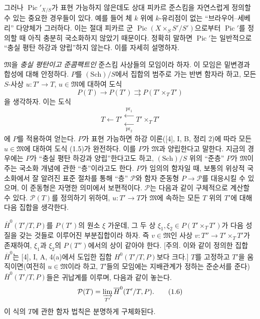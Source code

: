 그러나 $\operatorname{Pic}'_{X/S}$가 표현 가능하지 않은데도 상대 피카르
준스킴을 자연스럽게 정의할 수 있는 중요한 경우들이 있다. 예를 들어 체
$k$ 위에 $k$-유리점이 없는 “브라우어--세베리” 다양체가 그러하다. 이는
절대 피카르 군 $\operatorname{Pic}(X\times_S S'/S')$으로부터
$\operatorname{Pic}'$를 정의할 때 아직 충분히 국소화하지 않았기
때문이다. 정확히 말하면 $\operatorname{Pic}'$는 일반적으로 “충실 평탄
하강과 양립”하지 않는다. 이를 자세히 설명하자.

$\mathfrak M$을 \emph{충실 평탄이고 준콤팩트인} 준스킴 사상들의 모임이라
하자. 이 모임은 밑변경과 합성에 대해 안정하다. $P$를
$(\mathrm{Sch})/S$에서 집합의 범주로 가는 반변 함자라 하고, 모든
$S$-사상 $u:T'\longrightarrow T$, $u\in\mathfrak M$에 대하여 도식
\begin{equation}
P(T)\longrightarrow P(T')\rightrightarrows P(T'\times_TT')
\tag{1.5}
\end{equation}
을 생각하자. 이는 도식
\[
T\longleftarrow T'\mathrel{\substack{\xleftarrow{\,\mathrm{pr}_1\,}\\[-0.35ex]
\xleftarrow[\,\mathrm{pr}_2\,]{}}}T'\times_TT'
\]
에 $P$를 적용하여 얻는다. $P$가 표현 가능하면 하강 이론([4], I, B,
정리 2)에 따라 모든 $u\in\mathfrak M$에 대하여 도식 (1.5)가 완전하다.
이를 $P$가 $\mathfrak M$과 양립한다고 말한다. 지금의 경우에는 $P$가
“충실 평탄 하강과 양립”한다고도 하고, $(\mathrm{Sch})/S$ 위의 “준층”
$P$가 $\mathfrak M$이 주는 국소화 개념에 관한 “층”이라고도 한다. $P$가
임의의 함자일 때, 보통의 위상적 국소화에서 잘 알려진 표준 절차를 통해
“층” $\mathcal P$와 함자 준동형 $P\longrightarrow\mathcal P$를 대응시킬
수 있으며, 이 준동형은 자명한 의미에서 보편적이다. $\mathcal P$는 다음과
같이 구체적으로 계산할 수 있다. $\mathcal P(T)$를 정의하기 위하여,
$u:T'\longrightarrow T$가 $\mathfrak M$에 속하는 모든 $T$ 위의 $T'$에
대해 다음 집합을 생각한다.

$\overline H^0(T'/T,P)$를 $P(T')$의 원소 $\xi$ 가운데, 그 두 상
$\xi_1,\xi_2\in P(T'\times_TT')$가 다음 성질을 갖는 것들로 이루어진
부분집합이라 하자. 즉 $v\in\mathfrak M$인 사상
$v:T''\longrightarrow T'\times_TT'$가 존재하여, $\xi_1$과 $\xi_2$의
$P(T'')$에서의 상이 같아야 한다. [주의. 이와 같이 정의한 집합
$\overline H^0$는 [4], I, A, 4(a)에서 도입한 집합 $H^0(T'/T,P)$보다
크다.] $T$를 고정하고 $T'$을 움직이면(여전히 $u\in\mathfrak M$이라
하고, $T'$들의 모임에는 지배관계가 정하는 준순서를 준다)
$\overline H^0(T'/T,P)$들은 귀납계를 이루며, 다음과 같이 놓는다.
\begin{equation}
\mathcal P(T)=\varinjlim_{T'}\overline H^0(T'/T,P).
\tag{1.6}
\end{equation}
이 식의 $T$에 관한 함자 법칙은 분명하게 구체화된다.

